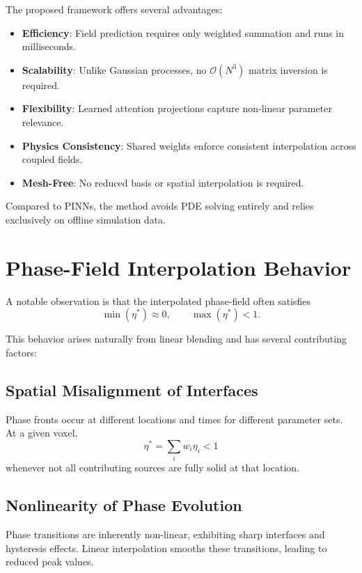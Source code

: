 \documentclass[10pt]{article}
\begin{document}
The proposed framework offers several advantages:
\begin{itemize}
\item \textbf{Efficiency}: Field prediction requires only weighted summation and runs in milliseconds.
\item \textbf{Scalability}: Unlike Gaussian processes, no $\mathcal{O}(N^3)$ matrix inversion is required.
\item \textbf{Flexibility}: Learned attention projections capture non-linear parameter relevance.
\item \textbf{Physics Consistency}: Shared weights enforce consistent interpolation across coupled fields.
\item \textbf{Mesh-Free}: No reduced basis or spatial interpolation is required.
\end{itemize}

Compared to PINNs, the method avoids PDE solving entirely and relies exclusively on offline simulation data.

\section{Phase-Field Interpolation Behavior}

A notable observation is that the interpolated phase-field often satisfies
\begin{equation}
\min(\eta^*) \approx 0, \qquad \max(\eta^*) < 1.
\end{equation}

This behavior arises naturally from linear blending and has several contributing factors:

\subsection{Spatial Misalignment of Interfaces}

Phase fronts occur at different locations and times for different parameter sets. At a given voxel,
\begin{equation}
\eta^* = \sum_i w_i \eta_i < 1
\end{equation}
whenever not all contributing sources are fully solid at that location.

\subsection{Nonlinearity of Phase Evolution}

Phase transitions are inherently non-linear, exhibiting sharp interfaces and hysteresis effects. Linear interpolation smooths these transitions, leading to reduced peak values.
\end{document}
